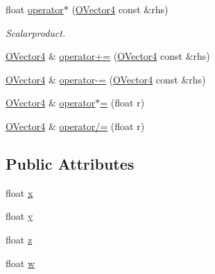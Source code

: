 \begin{DoxyCompactItemize}
\item 
float \hyperlink{struct_osiris_i_1_1_o_vector4_a28423161a6a82d0a7d46a28de431bb16}{operator$\ast$} (\hyperlink{struct_osiris_i_1_1_o_vector4}{O\-Vector4} const \&rhs)
\begin{DoxyCompactList}\small\item\em Scalarproduct. \end{DoxyCompactList}\item 
\hyperlink{struct_osiris_i_1_1_o_vector4}{O\-Vector4} \& \hyperlink{struct_osiris_i_1_1_o_vector4_ad7827e5c4721d6fc6725ba17f06c2b21}{operator+=} (\hyperlink{struct_osiris_i_1_1_o_vector4}{O\-Vector4} const \&rhs)
\item 
\hyperlink{struct_osiris_i_1_1_o_vector4}{O\-Vector4} \& \hyperlink{struct_osiris_i_1_1_o_vector4_ac8884820fc7ce2e531db46953617d7e8}{operator-\/=} (\hyperlink{struct_osiris_i_1_1_o_vector4}{O\-Vector4} const \&rhs)
\item 
\hyperlink{struct_osiris_i_1_1_o_vector4}{O\-Vector4} \& \hyperlink{struct_osiris_i_1_1_o_vector4_a6556f1dba66a66c2a03e3608a1ee0403}{operator$\ast$=} (float r)
\item 
\hyperlink{struct_osiris_i_1_1_o_vector4}{O\-Vector4} \& \hyperlink{struct_osiris_i_1_1_o_vector4_a1d00473b6c5d063451fded1ec4db5ad7}{operator/=} (float r)
\end{DoxyCompactItemize}
\subsection*{Public Attributes}
\begin{DoxyCompactItemize}
\item 
float \hyperlink{struct_osiris_i_1_1_o_vector4_af1adb199ffe43e6adfe6eca3fb9dd57b}{x}
\item 
float \hyperlink{struct_osiris_i_1_1_o_vector4_af5924ef3aa42370253f100d2442e403b}{y}
\item 
float \hyperlink{struct_osiris_i_1_1_o_vector4_ab3b7aaea4d1a5023b31aa26baa8288cf}{z}
\item 
float \hyperlink{struct_osiris_i_1_1_o_vector4_ae27a30926759cd8487c97977f8df711b}{w}
\end{DoxyCompactItemize}


